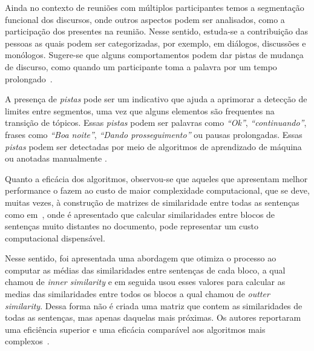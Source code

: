 Ainda no contexto de reuniões com múltiplos participantes temos a segmentação funcional dos discursos, onde outros aspectos podem ser analisados, como a participação dos presentes na reunião. Nesse sentido, estuda-se a contribuição das pessoas as quais podem ser categorizadas,  por exemplo, em diálogos, discussões e monólogos. Sugere-se que alguns comportamentos podem dar pistas de mudança de discurso, como quando um participante toma a palavra por um tempo prolongado~\cite{Bokaei2015}. 



A presença de \textit{pistas} pode ser um indicativo que ajuda a aprimorar a detecção de limites entre segmentos,
uma vez que alguns elementos são frequentes na transição de tópicos. Essas \textit{pistas} podem ser palavras como \textit{``Ok''}, \textit{``continuando''}, frases como \textit{``Boa noite''}, \textit{``Dando prosseguimento''} ou pausas prolongadas. Essas \textit{pistas} podem ser detectadas por meio de algoritmos de aprendizado de máquina ou anotadas manualmente
\cite{Hsueh2006} %
\cite{Galley2003} 
\cite{Beeferman1999}.



Quanto a eficácia dos algoritmos, observou-se que aqueles que apresentam melhor performance o fazem ao custo de maior complexidade computacional, que se deve, muitas vezes, à construção de matrizes de similaridade entre todas as sentenças como em~\cite{Choi2000}, onde é apresentado que calcular similaridades entre blocos de sentenças muito distantes no documento, pode representar um custo computacional dispensável. 

Nesse sentido, foi apresentada uma abordagem que otimiza o processo ao computar as médias das similaridades entre sentenças de cada bloco, a qual chamou de \textit{inner similarity} e em seguida usou esses valores para calcular as medias das similaridades entre todos os blocos a qual chamou de \textit{outter similarity}. Dessa forma não é criada uma matriz que contem as similaridades de todas as sentenças, mas apenas daquelas mais próximas. Os autores reportaram uma eficiência superior e uma eficácia comparável aos algoritmos mais complexos~\cite{Kern2009}.


